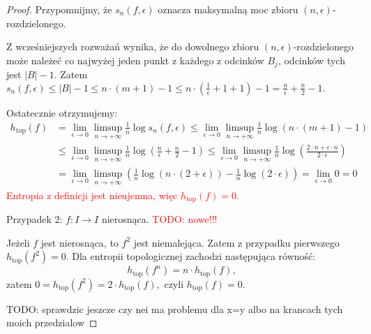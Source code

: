 \documentclass[licencjacka]{pwr_wmat_praca_dyplomowa}
\theoremstyle{plain}
\numberwithin{theorem}{chapter}
\theoremstyle{definition}
\numberwithin{theorem}{chapter}
\begin{document}
\begin{proof}
Przypomnijmy, że $s_n(f, \epsilon)$ oznacza maksymalną moc zbioru $(n, \epsilon)$-rozdzielonego. 


Z wcześniejszych rozważań wynika, że do dowolnego zbioru $(n, \epsilon)$-rozdzielonego może należeć co najwyżej jeden punkt z każdego z odcinków $B_j$, odcinków tych jest $|B|-1.$ Zatem $s_n(f, \epsilon) \leq |B|-1 \leq n \cdot (m+1) - 1 \leq n \cdot (\frac{1}{\epsilon}+1+1) - 1 = \frac{n}{\epsilon} + \frac{n}{2} - 1.$



Ostatecznie otrzymujemy:
\begin{equation}
\begin{aligned}
h_{\textrm{top}}(f) & = \lim_{\epsilon \rightarrow 0} \limsup_{n \rightarrow +\infty} \frac{1}{n} \log s_n(f, \epsilon) \leq \lim_{\epsilon \rightarrow 0} \limsup_{n \rightarrow +\infty} \frac{1}{n} \log ( n \cdot (m+1) - 1 ) \\
& \leq \lim_{\epsilon \rightarrow 0} \limsup_{n \rightarrow +\infty} \frac{1}{n} \log ( \frac{n}{\epsilon} + \frac{n}{2} - 1 ) \leq \lim_{\epsilon \rightarrow 0} \limsup_{n \rightarrow +\infty} \frac{1}{n} \log ( \frac{2 \cdot n + \epsilon \cdot n}{2 \cdot \epsilon}) \\
& = \lim_{\epsilon \rightarrow 0} \limsup_{n \rightarrow +\infty} (\frac{1}{n} \log (n \cdot (2 + \epsilon)) - \frac{1}{n} \log ( 2 \cdot \epsilon )) = \lim_{\epsilon \rightarrow 0} 0 = 0
\end{aligned}
\end{equation}
\textcolor{red}{
Entropia z definicji jest nieujemna, więc $h_{\textrm{top}}(f) = 0.$
}

\item[Przypadek 2: $f: I \rightarrow I$ nierosnąca.]
\textcolor{red}{TODO: nowe!!!}

Jeżeli $f$ jest nierosnąca, to $f^2$ jest niemalejąca. Zatem z przypadku pierwszego $h_{\textrm{top}}(f^2) = 0$. Dla entropii topologicznej zachodzi następująca równość: 
$$h_{\textrm{top}}(f^n) = n \cdot h_{\textrm{top}}(f),$$
zatem 
$0 = h_{\textrm{top}}(f^2) = 2 \cdot h_{\textrm{top}}(f),$
czyli
$h_{\textrm{top}}(f) = 0.$



TODO: sprawdzic jeszcze czy nei ma problemu dla x=y albo na krancach tych moich przedzialow

\end{proof}
 
\end{document}

